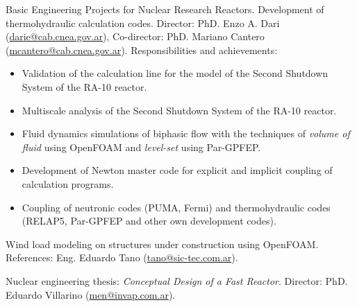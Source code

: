 \documentclass[11pt,a4paper,sans]{moderncv}        %
\begin{document}
{Basic Engineering Projects for Nuclear Research Reactors.\newline{}%
Development of thermohydraulic calculation codes.\newline{}%
Director: PhD. Enzo A. Dari (\href{mailto:darie@cab.cnea.gov.ar}{darie@cab.cnea.gov.ar}), Co-director: PhD. Mariano Cantero (\href{mailto:mcantero@cab.cnea.gov.ar}{mcantero@cab.cnea.gov.ar}).\newline{}%
Responsibilities and achievements:%
\begin{itemize}%
\item Validation of the calculation line for the model of the Second Shutdown System of the RA-10 reactor.
\item Multiscale analysis of the Second Shutdown System of the RA-10 reactor.
\item Fluid dynamics simulations of biphasic flow with the techniques of \textit{volume of fluid} using OpenFOAM and \textit{level-set} using Par-GPFEP.
\item Development of Newton master code for explicit and implicit coupling of calculation programs.
\item Coupling of neutronic codes (PUMA, Fermi) and thermohydraulic codes (RELAP5, Par-GPFEP and other own development codes).
\end{itemize}}

{Wind load modeling on structures under construction using OpenFOAM.\newline{}
References: Eng. Eduardo Tano (\href{mailto:tano@sic-tec.com.ar}{tano@sic-tec.com.ar}).}

{Nuclear engineering thesis: \textit{Conceptual Design of a Fast Reactor}.\newline{}
Director: PhD. Eduardo Villarino (\href{mailto:men@invap.com.ar}{men@invap.com.ar}).}

\end{document}

